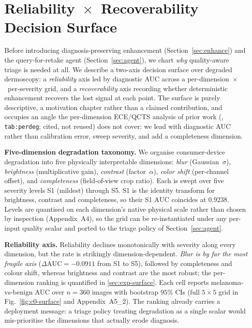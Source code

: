 
\section{Reliability~$\times$~Recoverability Decision Surface}
\label{sec:decision-surface}

Before introducing diagnosis-preserving enhancement (Section~\ref{sec:enhance}) and the query-for-retake agent (Section~\ref{sec:agent}), we chart \emph{why} quality-aware triage is needed at all. We describe a two-axis decision surface over degraded dermoscopy: a \emph{reliability} axis led by diagnostic AUC across a per-dimension~$\times$~per-severity grid, and a \emph{recoverability} axis recording whether deterministic enhancement recovers the lost signal at each point. The surface is purely descriptive, a motivation chapter rather than a claimed contribution, and occupies an angle the per-dimension ECE/QCTS analysis of prior work (\citep{ANON-BMVC}, \texttt{tab:perdeg}; cited, not reused) does not cover: we lead with diagnostic AUC rather than calibration error, sweep severity, and add a completeness dimension.

\textbf{Five-dimension degradation taxonomy.}
We organise consumer-device degradation into five physically interpretable dimensions: \emph{blur} (Gaussian~$\sigma$), \emph{brightness} (multiplicative gain), \emph{contrast} (factor~$\alpha$), \emph{color shift} (per-channel offset), and \emph{completeness} (field-of-view crop ratio). Each is swept over five severity levels S1 (mildest) through S5. S1 is the identity transform for brightness, contrast and completeness, so their S1 AUC coincides at $0.9238$. Levels are quantised on each dimension's native physical scale rather than chosen by inspection (Appendix~A4), so the grid can be re-instantiated under any per-input quality scalar and ported to the triage policy of Section~\ref{sec:agent}.

\textbf{Reliability axis.}
Reliability declines monotonically with severity along every dimension, but the rate is strikingly dimension-dependent. \emph{Blur is by far the most fragile axis} ($\Delta\mathrm{AUC}=-0.0911$ from S1 to S5), followed by completeness and colour shift, whereas brightness and contrast are the most robust; the per-dimension ranking is quantified in \cref{sec:exp-surface}. Each cell reports melanoma-vs-benign AUC over $n=360$ images with bootstrap $95\%$ CIs (full $5\times5$ grid in Fig.~\ref{fig:c0-surface} and Appendix~A5\_2). The ranking already carries a deployment message: a triage policy treating degradation as a single scalar would mis-prioritise the dimensions that actually erode diagnosis.

